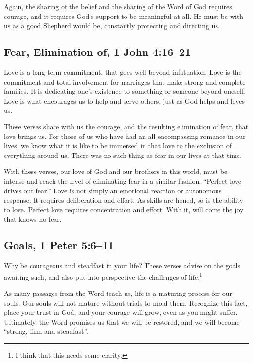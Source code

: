 \documentclass[12pt]{memoir}
\begin{document}
Again, the sharing of the belief and the sharing of the Word of
God requires courage, and it requires God's support to be meaningful
at all. He must be with us as a good Shepherd would be, constantly
protecting and directing us.

\subsection[Fear, Elimination of]{Fear, Elimination of, 1 John 4:16--21}

Love is a long term commitment, that goes well beyond infatuation.
Love is the commitment and total involvement for marriages that make
strong and complete families. It is dedicating one's existence to
something or someone beyond oneself. Love is what encourages us to
help and serve others, just as God helps and loves us.

These verses share with us the courage, and the resulting elimination
of fear, that love brings us. For those of us who have had an all
encompassing romance in our lives, we know what it is like to be immersed
in that love to the exclusion of everything around us. There was no
such thing as fear in our lives at that time.

With these verses, our love of God and our brothers in this world,
must be intense and reach the level of eliminating fear in a similar
fashion. ``Perfect love drives out fear.'' Love is not simply an
emotional reaction or autonomous response. It requires deliberation and effort. As skills are honed, so is the ability to love. Perfect
love requires concentration and effort. With it, will come the joy that knows no fear.

\subsection[Goals]{Goals, 1 Peter 5:6--11}

Why be courageous and steadfast in your life? These verses advise
on the goals awaiting such, and also put into perspective the challenges
of life.\footnote{I think that this needs some clarity.}

As many passages from the Word teach us, life is a maturing process
for our souls. Our souls will not mature without trials to mold them.
Recognize this fact, place your trust in God, and your courage will
grow, even as you might suffer. Ultimately, the Word promises us that
we will be restored, and we will become ``strong, firm and steadfast''.
\end{document}

